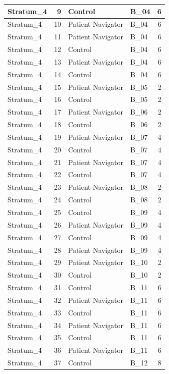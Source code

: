 \documentclass[
]{book}
\begin{document}
\begin{table}[H]
\begin{tabular}{l|r|l|l|r}
\hline
Stratum\_4 & 9 & Control & B\_04 & 6\\
\hline
Stratum\_4 & 10 & Patient Navigator & B\_04 & 6\\
\hline
Stratum\_4 & 11 & Patient Navigator & B\_04 & 6\\
\hline
Stratum\_4 & 12 & Control & B\_04 & 6\\
\hline
Stratum\_4 & 13 & Patient Navigator & B\_04 & 6\\
\hline
Stratum\_4 & 14 & Control & B\_04 & 6\\
\hline
Stratum\_4 & 15 & Patient Navigator & B\_05 & 2\\
\hline
Stratum\_4 & 16 & Control & B\_05 & 2\\
\hline
Stratum\_4 & 17 & Patient Navigator & B\_06 & 2\\
\hline
Stratum\_4 & 18 & Control & B\_06 & 2\\
\hline
Stratum\_4 & 19 & Patient Navigator & B\_07 & 4\\
\hline
Stratum\_4 & 20 & Control & B\_07 & 4\\
\hline
Stratum\_4 & 21 & Patient Navigator & B\_07 & 4\\
\hline
Stratum\_4 & 22 & Control & B\_07 & 4\\
\hline
Stratum\_4 & 23 & Patient Navigator & B\_08 & 2\\
\hline
Stratum\_4 & 24 & Control & B\_08 & 2\\
\hline
Stratum\_4 & 25 & Control & B\_09 & 4\\
\hline
Stratum\_4 & 26 & Patient Navigator & B\_09 & 4\\
\hline
Stratum\_4 & 27 & Control & B\_09 & 4\\
\hline
Stratum\_4 & 28 & Patient Navigator & B\_09 & 4\\
\hline
Stratum\_4 & 29 & Patient Navigator & B\_10 & 2\\
\hline
Stratum\_4 & 30 & Control & B\_10 & 2\\
\hline
Stratum\_4 & 31 & Control & B\_11 & 6\\
\hline
Stratum\_4 & 32 & Patient Navigator & B\_11 & 6\\
\hline
Stratum\_4 & 33 & Control & B\_11 & 6\\
\hline
Stratum\_4 & 34 & Patient Navigator & B\_11 & 6\\
\hline
Stratum\_4 & 35 & Control & B\_11 & 6\\
\hline
Stratum\_4 & 36 & Patient Navigator & B\_11 & 6\\
\hline
Stratum\_4 & 37 & Control & B\_12 & 8\\

\end{tabular}
\end{table}
\end{document}
